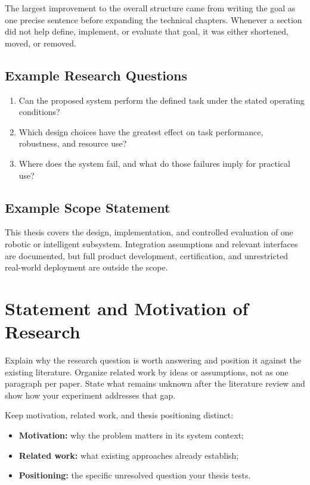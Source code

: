 \documentclass[a4paper,11pt,oneside]{article}
\begin{document}
  \begin{experiencenote}
  The largest improvement to the overall structure came from writing the goal
  as one precise sentence before expanding the technical chapters. Whenever a
  section did not help define, implement, or evaluate that goal, it was either
  shortened, moved, or removed.
  \end{experiencenote}

  \subsection{Example Research Questions}

  \begin{enumerate}[label=\textbf{RQ\arabic*:}]
    \item Can the proposed system perform the defined task under the stated
      operating conditions?
    \item Which design choices have the greatest effect on task performance,
      robustness, and resource use?
    \item Where does the system fail, and what do those failures imply for
      practical use?
  \end{enumerate}

  \subsection{Example Scope Statement}

  This thesis covers the design, implementation, and controlled evaluation of
  one robotic or intelligent subsystem. Integration assumptions and relevant
  interfaces are documented, but full product development, certification, and
  unrestricted real-world deployment are outside the scope.

  \section{Statement and Motivation of Research}

  \begin{guidance}
  Explain why the research question is worth answering and position it against
  the existing literature. Organize related work by ideas or assumptions, not
  as one paragraph per paper. State what remains unknown after the literature
  review and show how your experiment addresses that gap.

  Keep motivation, related work, and thesis positioning distinct:
  \begin{itemize}
    \item \textbf{Motivation:} why the problem matters in its system context;
    \item \textbf{Related work:} what existing approaches already establish;
    \item \textbf{Positioning:} the specific unresolved question your thesis tests.
  \end{itemize}
  \end{guidance}
\end{document}
